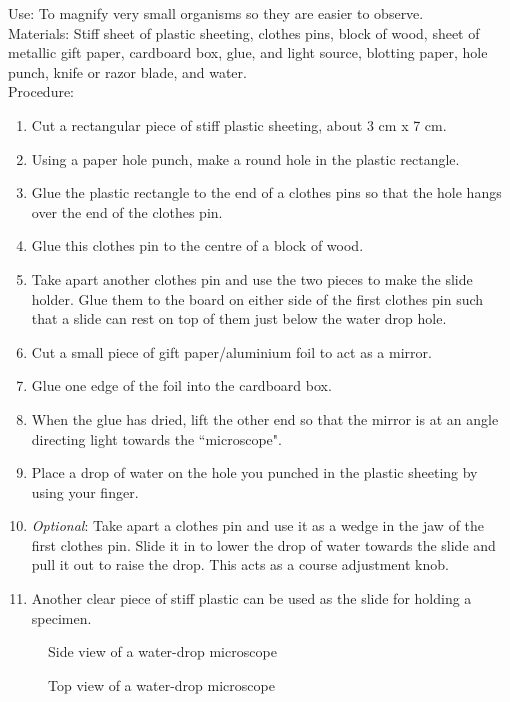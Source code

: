 Use: To magnify very small organisms so they are easier to observe.\\
Materials: Stiff sheet of plastic sheeting, clothes pins, block of wood, sheet of metallic gift paper, cardboard box, glue, and light source, blotting paper, hole punch, knife or razor blade, and water.\\
Procedure: 
\begin{enumerate} 
\item Cut a rectangular piece of stiff plastic sheeting, about 3 cm x 7 cm.
\item Using a paper hole punch, make a round hole in the plastic rectangle. 
\item Glue the plastic rectangle to the end of a clothes pins so that the hole hangs over the end of the clothes pin.
\item Glue this clothes pin to the centre of a block of wood.
\item Take apart another clothes pin and use the two pieces to make the slide holder. Glue them to the board on either side of the first clothes pin such that a slide can rest on top of them just below the water drop hole.
\item Cut a small piece of gift paper/aluminium foil to act as a mirror.
\item Glue one edge of the foil into the cardboard box.
\item When the glue has dried, lift the other end so that the mirror is at an angle directing light towards the ``microscope".
\item Place a drop of water on the hole you punched in the plastic sheeting by using your finger.
\item \textit{Optional}: Take apart a clothes pin and use it as a wedge in the jaw of the first clothes pin. Slide it in to lower the drop of water towards the slide and pull it out to raise the drop. This acts as a course adjustment knob.
\item Another clear piece of stiff plastic can be used as the slide for holding a specimen.
\end{enumerate}

\begin{figure}[H]
\begin{center}
\def\svgwidth{350pt}

\caption{Side view of a water-drop microscope}
\label{fig:microscope-side}
\end{center}
\end{figure}

\begin{figure}[H]
\begin{center}
\def\svgwidth{350pt}

\caption{Top view of a water-drop microscope}
\label{fig:microscope-top}
\end{center}
\end{figure}
